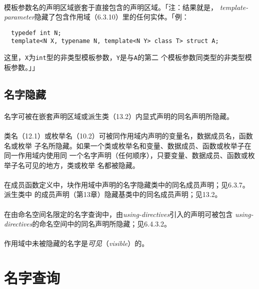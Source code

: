 \paragraph{}
模板参数名的声明区域嵌套于直接包含的声明区域。「注：结果就是，
\textit{template-parameter}隐藏了包含作用域（6.3.10）里的任何实体。「例：
\begin{lstlisting}
  typedef int N;
  template<N X, typename N, template<N Y> class T> struct A;
\end{lstlisting}
这里，\texttt{X}为\texttt{int}型的非类型模板参数，\texttt{Y}是与\texttt{A}的第二
个模板参数同类型的非类型模板参数。」」

\subsection{名字隐藏}
\paragraph{}
名字可被在嵌套声明区域或派生类（13.2）内显式声明的同名声明所隐藏。

\paragraph{}
类名（12.1）或枚举名（10.2）可被同作用域内声明的变量名，数据成员名，函数名或枚举
子名所隐藏。如果一个类或枚举名和变量、数据成员、函数或枚举子在同一作用域内使用同
一个名字声明（任何顺序），只要变量、数据成员、函数或枚举子名可见的地方，类或枚举
名都被隐藏。

\paragraph{}
在成员函数定义中，块作用域中声明的名字隐藏类中的同名成员声明；见6.3.7。派生类中
的成员声明（第13章）隐藏基类中的同名成员声明；见13.2。

\paragraph{}
在由命名空间名限定的名字查询中，由\textit{using-directives}引入的声明可被包含
\textit{using-directives}的命名空间中的同名声明所隐藏；见6.4.3.2。

\paragraph{}
作用域中未被隐藏的名字是\textit{可见}（\textit{visible}）的。


\section{名字查询}
